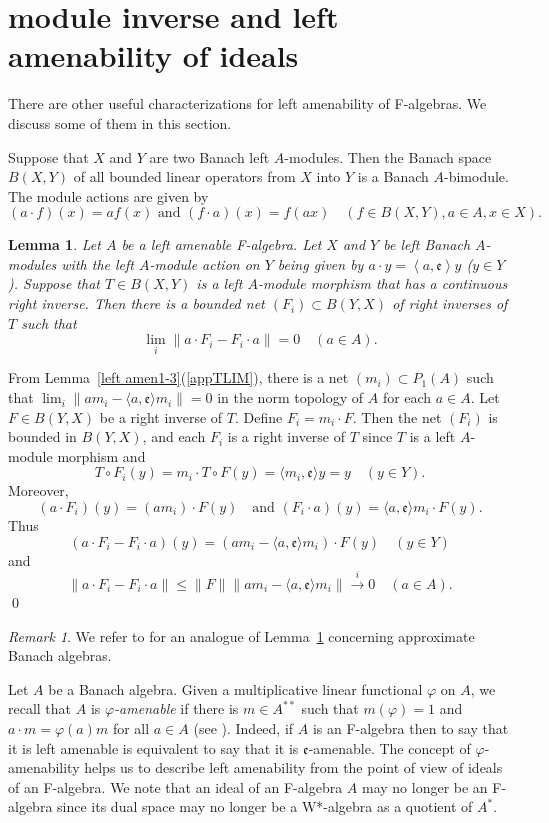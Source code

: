 \documentclass{tran-l}
\numberwithin{equation}{section}
\newtheorem{lemma}[thm]{Lemma}
\theoremstyle{definition}
\theoremstyle{remark}
\newtheorem{remark}[thm]{Remark}
\begin{document}
\section{module inverse and left amenability of ideals}\label{sec 5}

There are other useful characterizations for left amenability of F-algebras. We discuss some of them in this section.

Suppose that $X$ and $Y$ are two Banach left $A$-modules. Then the Banach space $B(X,Y)$ of all bounded linear operators from $X$ into $Y$ is a Banach $A$-bimodule. The module actions are given by 
\[
(a\cdot f)(x) = a f(x) \text{ and } (f\cdot a)(x) = f(ax) \quad (f\in B(X,Y), a\in A, x\in X).
\]

\begin{lemma}\label{net}
Let $ A$ be a left amenable F-algebra.  Let $X$ and $Y$ be left Banach $ A$-modules with the left $ A$-module action on $Y$ being given by $a\cdot y =  \left\langle a,{\mathfrak{e}} \right\rangle y$ ($y\in Y$). Suppose that $T\in B(X,Y)$ is a left $ A$-module morphism that has a continuous right inverse. Then there is a bounded net $(F_i)\subset B(Y,X)$ of right inverses of $T$ such that 
\[
\lim_i\|a\cdot F_i - F_i\cdot a\| = 0 \quad (a\in A).
\]
\end{lemma}
\proof
From Lemma~\ref{left amen1-3}(\ref{appTLIM}), there is a net $(m_i)\subset P_1(A)$ such that $\lim_i\|am_i - {\langle} a,{\mathfrak{e}}{\rangle} m_i \|=0$ in the norm topology of $A$ for each $a\in A$. 
Let $F\in B(Y,X)$ be a right inverse of $T$.
   Define $F_i= m_i\cdot F$.
    Then the net $(F_i)$ is bounded in $B(Y,X)$, and each $F_i$ is a right inverse of $T$ since $T$ is a left $A$-module morphism and
\[
T\circ F_i(y) = m_i\cdot T\circ F(y) ={\langle} m_i, {\mathfrak{e}}{\rangle} y = y \quad (y\in Y).
\]
 Moreover, 
 \[(a\cdot F_i)(y) =(am_i)\cdot F(y) \quad
  \text{and } 
  (F_i\cdot a)(y) = {\langle} a,{\mathfrak{e}} {\rangle}  m_i \cdot F(y).
  \]
   Thus 
\[
(a\cdot F_i -F_i \cdot a)(y) = (am_i - {\langle} a,{\mathfrak{e}} {\rangle} m_i)\cdot F(y) \quad (y\in Y)
\]
and 
\[
\|a\cdot F_i - F_i \cdot a\| \leq \|F\| \|am_i -  {\langle} a,{\mathfrak{e}} {\rangle} m_i\| \overset{i}{\to} 0 \quad (a\in  A).
\]
\qed

\begin{remark}
 We refer to \cite[Theorem~3.1]{Zhang_survey} for an analogue of Lemma~\ref{net} concerning approximate Banach algebras. 
\end{remark}

Let $A$ be a Banach algebra. Given a multiplicative linear functional $\varphi$ on $A$, we recall that $A$ is \emph{$\varphi$-amenable} if there is $m\in A^{**}$ such that $m(\varphi) = 1$ and $a\cdot m =\varphi(a) m$ for all $a\in A$ (see \cite{
H-S-T, Mehdi}). Indeed, if $A$  is an F-algebra then to say that it is left amenable is equivalent to say that it is ${\mathfrak{e}}$-amenable. The concept of $\varphi$-amenability helps us to describe left amenability from the point of view of ideals of an F-algebra. We note that an ideal of an F-algebra $A$ may no longer be an F-algebra since its dual space may no longer be a W*-algebra as a quotient of $A^*$.
 
\end{document}
